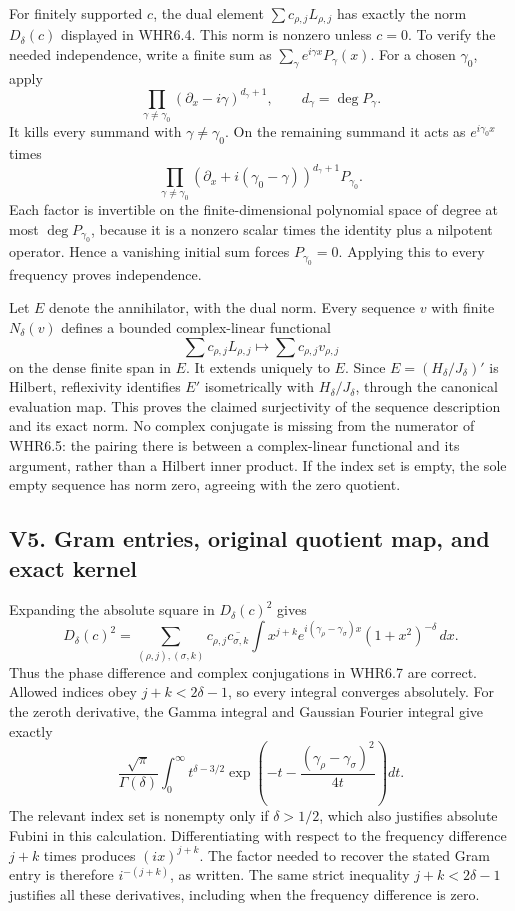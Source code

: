 For finitely supported \(c\), the dual element
\(\sum c_{\rho,j}L_{\rho,j}\) has exactly the norm \(D_\delta(c)\)
displayed in WHR6.4. This norm is nonzero unless \(c=0\). To verify the
needed independence, write a finite sum as
\(\sum_\gamma e^{i\gamma x}P_\gamma(x)\). For a chosen \(\gamma_0\),
apply \[
\prod_{\gamma\ne\gamma_0}(\partial_x-i\gamma)^{d_\gamma+1},
\qquad d_\gamma=\deg P_\gamma.
\] It kills every summand with \(\gamma\ne\gamma_0\). On the remaining
summand it acts as \(e^{i\gamma_0x}\) times \[
\prod_{\gamma\ne\gamma_0}
(\partial_x+i(\gamma_0-\gamma))^{d_\gamma+1}P_{\gamma_0}.
\] Each factor is invertible on the finite-dimensional polynomial space
of degree at most \(\deg P_{\gamma_0}\), because it is a nonzero scalar
times the identity plus a nilpotent operator. Hence a vanishing initial
sum forces \(P_{\gamma_0}=0\). Applying this to every frequency proves
independence.

Let \(E\) denote the annihilator, with the dual norm. Every sequence
\(v\) with finite \(N_\delta(v)\) defines a bounded complex-linear
functional \[
\sum c_{\rho,j}L_{\rho,j}\longmapsto
\sum c_{\rho,j}v_{\rho,j}
\] on the dense finite span in \(E\). It extends uniquely to \(E\).
Since \(E=(H_\delta/J_\delta)'\) is Hilbert, reflexivity identifies
\(E'\) isometrically with \(H_\delta/J_\delta\), through the canonical
evaluation map. This proves the claimed surjectivity of the sequence
description and its exact norm. No complex conjugate is missing from the
numerator of WHR6.5: the pairing there is between a complex-linear
functional and its argument, rather than a Hilbert inner product. If the
index set is empty, the sole empty sequence has norm zero, agreeing with
the zero quotient.

\subsection{V5. Gram entries, original quotient map, and exact
kernel}\label{v5.-gram-entries-original-quotient-map-and-exact-kernel}

Expanding the absolute square in \(D_\delta(c)^2\) gives \[
D_\delta(c)^2
=\sum_{(\rho,j),(\sigma,k)}
c_{\rho,j}\overline{c_{\sigma,k}}
\int x^{j+k}e^{i(\gamma_\rho-\gamma_\sigma)x}
(1+x^2)^{-\delta}\,dx.
\] Thus the phase difference and complex conjugations in WHR6.7 are
correct. Allowed indices obey \(j+k<2\delta-1\), so every integral
converges absolutely. For the zeroth derivative, the Gamma integral and
Gaussian Fourier integral give exactly \[
\frac{\sqrt\pi}{\Gamma(\delta)}
\int_0^\infty t^{\delta-3/2}
\exp\left(-t-\frac{(\gamma_\rho-\gamma_\sigma)^2}{4t}\right)dt.
\] The relevant index set is nonempty only if \(\delta>1/2\), which also
justifies absolute Fubini in this calculation. Differentiating with
respect to the frequency difference \(j+k\) times produces
\((ix)^{j+k}\). The factor needed to recover the stated Gram entry is
therefore \(i^{-(j+k)}\), as written. The same strict inequality
\(j+k<2\delta-1\) justifies all these derivatives, including when the
frequency difference is zero.

